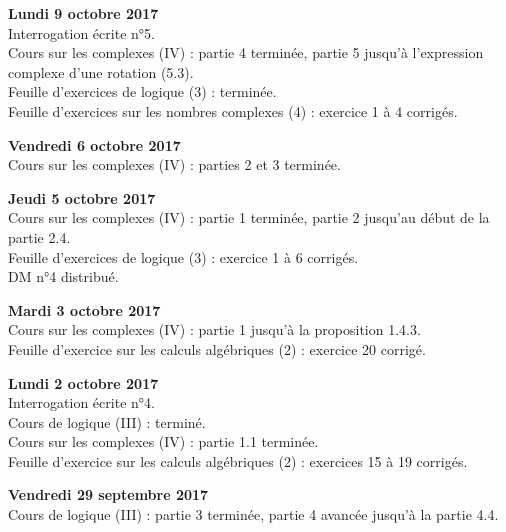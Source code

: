 \documentclass[12pt,a4paper]{article}
\begin{document}
\noindent\textbf{Lundi 9 octobre 2017}\\
\bu{} Interrogation écrite n°5.\\
\bu{} Cours sur les complexes (IV) : partie 4 terminée, partie 5 jusqu'à l'expression complexe d'une rotation (5.3). \\
\bu{} Feuille d'exercices de logique (3) : terminée. \\
\bu{} Feuille d'exercices sur les nombres complexes (4) : exercice 1 à 4 corrigés. \\
\vspace{.4cm}

\noindent\textbf{Vendredi 6 octobre 2017}\\
\bu{} Cours sur les complexes (IV) : parties 2 et 3 terminée. \\
\vspace{.4cm}

\noindent\textbf{Jeudi 5 octobre 2017}\\
\bu{} Cours sur les complexes (IV) : partie 1 terminée, partie 2 jusqu'au début de la partie 2.4. \\
\bu{} Feuille d'exercices de logique (3) : exercice 1 à 6 corrigés. \\
\bu{} DM n°4 distribué.\\
\vspace{.4cm}

\noindent\textbf{Mardi 3 octobre 2017}\\
\bu{} Cours sur les complexes (IV) : partie 1 jusqu'à la proposition 1.4.3. \\
\bu{} Feuille d'exercice sur les calculs algébriques (2) : exercice 20 corrigé. \\
\vspace{.4cm}

\noindent\textbf{Lundi 2 octobre 2017}\\
\bu{} Interrogation écrite n°4.\\
\bu{} Cours de logique (III) : terminé. \\
\bu{} Cours sur les complexes (IV) : partie 1.1 terminée. \\
\bu{} Feuille d'exercice sur les calculs algébriques (2) : exercices 15 à 19 corrigés. \\
\vspace{.4cm}

\noindent\textbf{Vendredi 29 septembre 2017}\\
\bu{} Cours de logique (III) : partie 3 terminée, partie 4 avancée jusqu'à la partie 4.4. \\
\vspace{.4cm}
\end{document}
